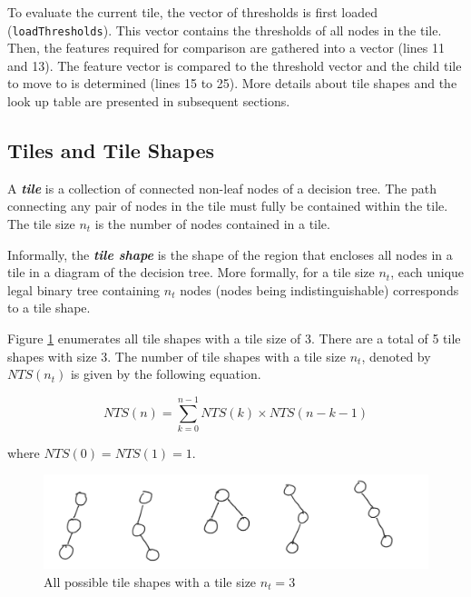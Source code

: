 To evaluate the current tile, the vector of thresholds is first loaded (\texttt{loadThresholds}). This vector contains the thresholds of all nodes in the tile. Then, the features required for comparison are gathered into a vector (lines 11 and 13). The feature vector is compared to the threshold vector and the child tile to move to is determined (lines 15 to 25). More details about tile shapes and the look up table are presented in subsequent sections.

\subsection{Tiles and Tile Shapes}
A \textbf{\emph{tile}} is a collection of connected non-leaf nodes of a decision tree. The path connecting any pair of nodes in the tile must fully be contained within the tile. The tile size $n_t$ is the number of nodes contained in a tile.

Informally, the \textbf{\emph{tile shape}} is the shape of the region that encloses all nodes in a tile in a diagram of the decision tree. More formally, for a tile size $n_t$, each unique legal binary tree containing $n_t$ nodes (nodes being indistinguishable) corresponds to a tile shape.

Figure \ref{Fig:TileSize3Shapes} enumerates all tile shapes with a tile size of 3. There are a total of 5 tile shapes with size 3. The number of tile shapes with a tile size $n_t$, denoted by $NTS(n_t)$ is given by the following equation. 

\begin{equation}
  NTS(n) = \sum_{k=0}^{n-1} NTS(k) \times NTS(n-k-1)
\end{equation}

where $NTS(0) = NTS(1) = 1$.

\begin{figure}
  \centering
  \includegraphics[width=\linewidth]{figures/TileShapes_Size3.PNG}
  \caption{All possible tile shapes with a tile size $n_t=3$}
  \label{Fig:TileSize3Shapes}
\end{figure}

